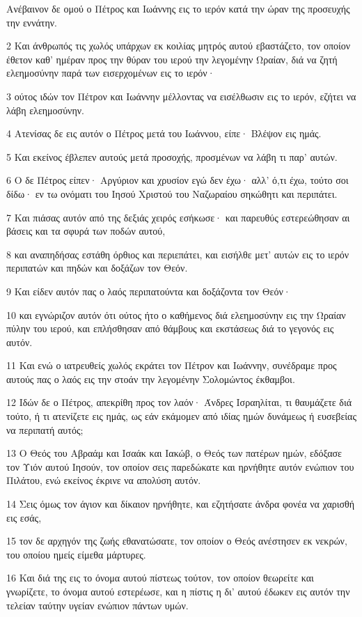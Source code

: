 \par Ανέβαινον δε ομού ο Πέτρος και Ιωάννης εις το ιερόν κατά την ώραν της προσευχής την εννάτην.
\par 2 Και άνθρωπός τις χωλός υπάρχων εκ κοιλίας μητρός αυτού εβαστάζετο, τον οποίον έθετον καθ' ημέραν προς την θύραν του ιερού την λεγομένην Ωραίαν, διά να ζητή ελεημοσύνην παρά των εισερχομένων εις το ιερόν·
\par 3 ούτος ιδών τον Πέτρον και Ιωάννην μέλλοντας να εισέλθωσιν εις το ιερόν, εζήτει να λάβη ελεημοσύνην.
\par 4 Ατενίσας δε εις αυτόν ο Πέτρος μετά του Ιωάννου, είπε· Βλέψον εις ημάς.
\par 5 Και εκείνος έβλεπεν αυτούς μετά προσοχής, προσμένων να λάβη τι παρ' αυτών.
\par 6 Ο δε Πέτρος είπεν· Αργύριον και χρυσίον εγώ δεν έχω· αλλ' ό,τι έχω, τούτο σοι δίδω· εν τω ονόματι του Ιησού Χριστού του Ναζωραίου σηκώθητι και περιπάτει.
\par 7 Και πιάσας αυτόν από της δεξιάς χειρός εσήκωσε· και παρευθύς εστερεώθησαν αι βάσεις και τα σφυρά των ποδών αυτού,
\par 8 και αναπηδήσας εστάθη όρθιος και περιεπάτει, και εισήλθε μετ' αυτών εις το ιερόν περιπατών και πηδών και δοξάζων τον Θεόν.
\par 9 Και είδεν αυτόν πας ο λαός περιπατούντα και δοξάζοντα τον Θεόν·
\par 10 και εγνώριζον αυτόν ότι ούτος ήτο ο καθήμενος διά ελεημοσύνην εις την Ωραίαν πύλην του ιερού, και επλήσθησαν από θάμβους και εκστάσεως διά το γεγονός εις αυτόν.
\par 11 Και ενώ ο ιατρευθείς χωλός εκράτει τον Πέτρον και Ιωάννην, συνέδραμε προς αυτούς πας ο λαός εις την στοάν την λεγομένην Σολομώντος έκθαμβοι.
\par 12 Ιδών δε ο Πέτρος, απεκρίθη προς τον λαόν· Άνδρες Ισραηλίται, τι θαυμάζετε διά τούτο, ή τι ατενίζετε εις ημάς, ως εάν εκάμομεν από ιδίας ημών δυνάμεως ή ευσεβείας να περιπατή αυτός;
\par 13 Ο Θεός του Αβραάμ και Ισαάκ και Ιακώβ, ο Θεός των πατέρων ημών, εδόξασε τον Υιόν αυτού Ιησούν, τον οποίον σεις παρεδώκατε και ηρνήθητε αυτόν ενώπιον του Πιλάτου, ενώ εκείνος έκρινε να απολύση αυτόν.
\par 14 Σεις όμως τον άγιον και δίκαιον ηρνήθητε, και εζητήσατε άνδρα φονέα να χαρισθή εις εσάς,
\par 15 τον δε αρχηγόν της ζωής εθανατώσατε, τον οποίον ο Θεός ανέστησεν εκ νεκρών, του οποίου ημείς είμεθα μάρτυρες.
\par 16 Και διά της εις το όνομα αυτού πίστεως τούτον, τον οποίον θεωρείτε και γνωρίζετε, το όνομα αυτού εστερέωσε, και η πίστις η δι' αυτού έδωκεν εις αυτόν την τελείαν ταύτην υγείαν ενώπιον πάντων υμών.
